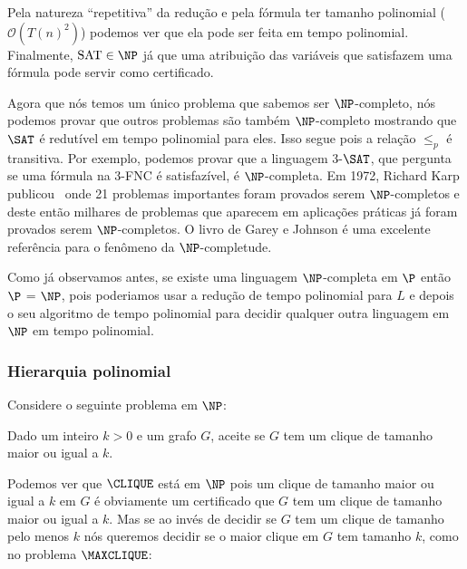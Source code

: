 Pela natureza ``repetitiva'' da redução e pela fórmula ter tamanho polinomial ($\mathcal{O}(T(n)^{2})$) podemos ver que ela pode ser feita em tempo polinomial. Finalmente, $\text{SAT} \in \NP$ já que uma atribuição das variáveis que satisfazem uma fórmula pode servir como certificado.

Agora que nós temos um único problema que sabemos ser $\NP$-completo, nós podemos provar que outros problemas são também $\NP$-completo mostrando que $\SAT$ é redutível em tempo polinomial para eles. Isso segue pois a relação $\leq_{p}$ é transitiva. Por exemplo, podemos provar que a linguagem 3-$\SAT$, que pergunta se uma fórmula na 3-FNC é satisfazível, é $\NP$-completa. Em 1972, Richard Karp publicou~\cite{karp1972reducibility} onde 21 problemas importantes foram provados serem $\NP$-completos e deste então milhares de problemas que aparecem em aplicações práticas já foram provados serem $\NP$-completos. O livro de Garey e Johnson é uma excelente referência para o fenômeno da $\NP$-completude.~\cite{garey2002computers}

Como já observamos antes, se existe uma linguagem $\NP$-completa em $\P$ então $\P$ = $\NP$, pois poderiamos usar a redução de tempo polinomial para $L$ e depois o seu algoritmo de tempo polinomial para decidir qualquer outra linguagem em $\NP$ em tempo polinomial.






\subsubsection{Hierarquia polinomial}

Considere o seguinte problema em $\NP$:

\begin{clique}

Dado um inteiro $k > 0$ e um grafo $G$, aceite se $G$ tem um clique de tamanho maior ou igual a $k$.

\end{clique}

Podemos ver que $\CLIQUE$ está em $\NP$ pois um clique de tamanho maior ou igual a $k$ em $G$ é obviamente um certificado que $G$ tem um clique de tamanho maior ou igual a $k$. Mas se ao invés de decidir se $G$ tem um clique de tamanho pelo menos $k$ nós queremos decidir se o maior clique em $G$ tem tamanho $k$, como no problema $\MAXCLIQUE$:

